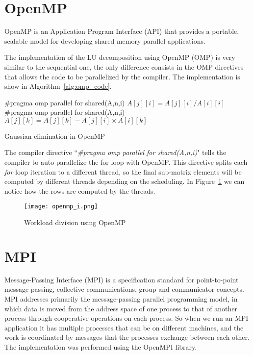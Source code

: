 \section{OpenMP}
OpenMP is an Application Program Interface (API) that provides a portable, scalable model for developing shared memory parallel applications.

The implementation of the LU decomposition using OpenMP (OMP) is very similar to the sequential one, the only difference consists in the OMP directives that allows the code to be parallelized by the compiler. The implementation is show in Algorithm~\ref{alg:omp_code}.

\begin{algorithm}
\begin{algorithmic}
	\State \#pragma omp parallel for shared(A,n,i)
		\State $A[j][i] = A[j][i] / A[i][i]$ 
	\EndFor
	\State \#pragma omp parallel for shared(A,n,i)
			\State $A[j][k] = A[j][k] - A[j][i] \times A[i][k]$ 
		\EndFor	
	\EndFor
\EndFor
\end{algorithmic}
\caption{Gaussian elimination in OpenMP}
\label{alg:omp_code}
\end{algorithm}

The compiler directive ``\textit{\#pragma omp parallel for shared(A,n,i)}" tells the compiler to auto-parallelize the for loop with OpenMP. This directive splits each \textit{for} loop iteration to a different thread, so the final sub-matrix elements will be computed by different threads depending on the scheduling. In Figure~\ref{img:omp_workload}  we can notice how the rows are computed by the threads. 


\begin{figure}[H]
\centering
\texttt{[image: openmp\_i.png]}
\caption{Workload division using OpenMP}
\label{img:omp_workload}
\end{figure}

\pagebreak

\section{MPI}

Message-Passing Interface (MPI) is a specification standard for point-to-point message-passing, collective communications, group and communicator concepts. MPI addresses primarily the message-passing parallel programming model, in which data is moved from the address space of one process to that of another process through cooperative operations on each process. So when we run an MPI application it has multiple processes that can be on different machines, and the work is coordinated by messages that the processes exchange between each other. The implementation was performed using the OpenMPI library.

